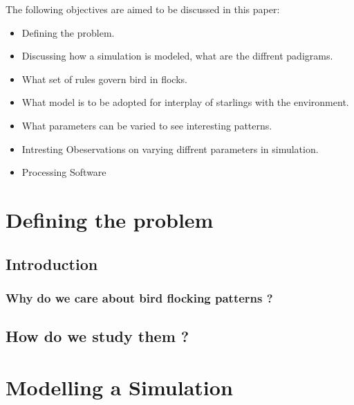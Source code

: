 \documentclass[12pt]{report}
\begin{document}
The following objectives are aimed to be discussed in this paper:
\begin{itemize}
  \item
  Defining the problem.
  \item
  Discussing how a simulation is modeled, what are the diffrent padigrams.
  \item
  What set of rules govern bird in flocks.
  \item
  What model is to be adopted for interplay of starlings with the environment.
  \item
  What parameters can be varied to see interesting patterns.
  \item
  Intresting Obeservations on varying diffrent parameters in simulation.
  \item 
  Processing Software
\end{itemize}

\chapter{Defining the problem}
\section{Introduction}
\subsection{Why do we care about bird flocking patterns ?}
\section{How do we study them ?}

\chapter{Modelling a Simulation}
\end{document}
